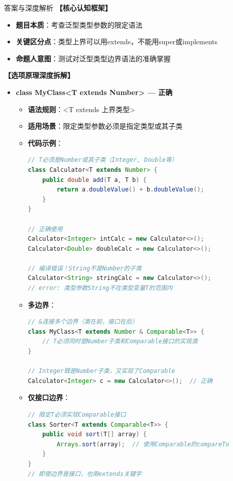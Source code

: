\documentclass[12pt, a4paper]{ctexart}
\begin{document}
\begin{enumerate}[label=\textbf{\arabic*.}]
\begin{bluebox}{答案与深度解析}
		      \textbf{【核心认知框架】}
		      \begin{itemize}[label={}, leftmargin=*, nosep]
			      \item \textbf{题目本质}：考查泛型类型参数的限定语法
			      \item \textbf{关键区分点}：类型上界可以用extends，不能用super或implements
			      \item \textbf{命题人意图}：测试对泛型类型边界语法的准确掌握
		      \end{itemize}

		      \textbf{【选项原理深度拆解】}

		      \begin{itemize}[leftmargin=*, nosep, label={}]
			      \item[A] \textbf{class MyClass<T extends Number> — 正确}
			            \begin{itemize}[label={}, leftmargin=*, nosep]
				            \item \textbf{语法规则}：<T extends 上界类型>
				            \item \textbf{适用场景}：限定类型参数必须是指定类型或其子类
				            \item \textbf{代码示例}：
				                  \begin{lstlisting}[language=Java]
// T必须是Number或其子类（Integer, Double等）
class Calculator<T extends Number> {
    public double add(T a, T b) {
        return a.doubleValue() + b.doubleValue();
    }
}

// 正确使用
Calculator<Integer> intCalc = new Calculator<>();
Calculator<Double> doubleCalc = new Calculator<>();

// 编译错误！String不是Number的子类
Calculator<String> stringCalc = new Calculator<>();
// error: 类型参数String不在类型变量T的范围内
				      \end{lstlisting}
				            \item \textbf{多边界}：
				                  \begin{lstlisting}[language=Java]
// &连接多个边界（类在前，接口在后）
class MyClass<T extends Number & Comparable<T>> {
    // T必须同时是Number子类和Comparable接口的实现类
}

// Integer既是Number子类，又实现了Comparable
Calculator<Integer> c = new Calculator<>();  // 正确
				      \end{lstlisting}
				            \item \textbf{仅接口边界}：
				                  \begin{lstlisting}[language=Java]
// 限定T必须实现Comparable接口
class Sorter<T extends Comparable<T>> {
    public void sort(T[] array) {
        Arrays.sort(array);  // 使用Comparable的compareTo
    }
}
// 即使边界是接口，也用extends关键字
				      \end{lstlisting}
			            \end{itemize}


\end{itemize}
\end{bluebox}
\end{enumerate}
\end{document}
